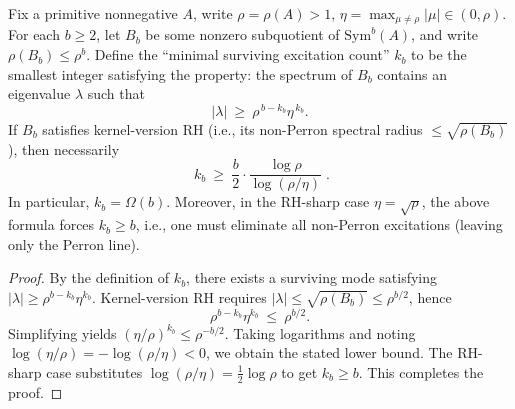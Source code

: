 \begin{theorem}\label{thm:pom-excitation-filter-linear-bound}
Fix a primitive nonnegative \(A\), write \(\rho=\rho(A)>1\), \(\eta=\max_{\mu\ne\rho}|\mu|\in(0,\rho)\).
For each \(b\ge 2\), let \(B_b\) be some nonzero subquotient of \(\mathrm{Sym}^b(A)\), and write \(\rho(B_b)\le \rho^b\).
Define the ``minimal surviving excitation count'' \(k_b\) to be the smallest integer satisfying the property: the spectrum of \(B_b\) contains an eigenvalue \(\lambda\) such that
\[
|\lambda|\ \ge\ \rho^{\,b-k_b}\eta^{\,k_b}.
\]
If \(B_b\) satisfies kernel-version RH (i.e., its non-Perron spectral radius \(\le \sqrt{\rho(B_b)}\)), then necessarily
\[
\boxed{\;
k_b\ \ge\ \frac{b}{2}\cdot \frac{\log\rho}{\log(\rho/\eta)}\; }.
\]
In particular, \(k_b=\Omega(b)\).
Moreover, in the RH-sharp case \(\eta=\sqrt{\rho}\), the above formula forces \(k_b\ge b\), i.e., one must eliminate all non-Perron excitations (leaving only the Perron line).
\end{theorem}
\begin{proof}
By the definition of \(k_b\), there exists a surviving mode satisfying \(|\lambda|\ge \rho^{b-k_b}\eta^{k_b}\).
Kernel-version RH requires \(|\lambda|\le \sqrt{\rho(B_b)}\le \rho^{b/2}\), hence
\[
\rho^{b-k_b}\eta^{k_b}\ \le\ \rho^{b/2}.
\]
Simplifying yields \((\eta/\rho)^{k_b}\le \rho^{-b/2}\).
Taking logarithms and noting \(\log(\eta/\rho)=-\log(\rho/\eta)<0\), we obtain the stated lower bound.
The RH-sharp case substitutes \(\log(\rho/\eta)=\tfrac12\log\rho\) to get \(k_b\ge b\). This completes the proof.
\end{proof}

